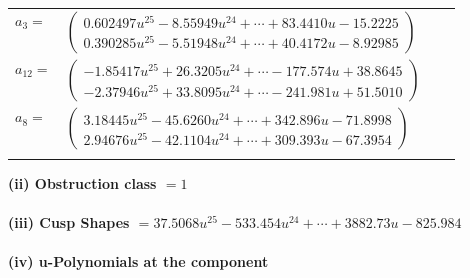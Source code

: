 \documentclass[1p]{elsarticle_modified}
\theoremstyle{definition}
\begin{document}
\begin{tabular}{m{7pt} m{180pt} m{7pt} m{180pt} }
\flushright $a_{3}=$&$\begin{pmatrix}0.602497 u^{25}-8.55949 u^{24}+\cdots+83.4410 u-15.2225\\0.390285 u^{25}-5.51948 u^{24}+\cdots+40.4172 u-8.92985\end{pmatrix}$ \\
\flushright $a_{12}=$&$\begin{pmatrix}-1.85417 u^{25}+26.3205 u^{24}+\cdots-177.574 u+38.8645\\-2.37946 u^{25}+33.8095 u^{24}+\cdots-241.981 u+51.5010\end{pmatrix}$ \\
\flushright $a_{8}=$&$\begin{pmatrix}3.18445 u^{25}-45.6260 u^{24}+\cdots+342.896 u-71.8998\\2.94676 u^{25}-42.1104 u^{24}+\cdots+309.393 u-67.3954\end{pmatrix}$\\&\end{tabular}
\flushleft \textbf{(ii) Obstruction class $= 1$}\\~\\
\flushleft \textbf{(iii) Cusp Shapes $= 37.5068 u^{25}-533.454 u^{24}+\cdots+3882.73 u-825.984$}\\~\\
\newpage\renewcommand{\arraystretch}{1}
\flushleft \textbf{(iv) u-Polynomials at the component}\newline \\
\end{document}
